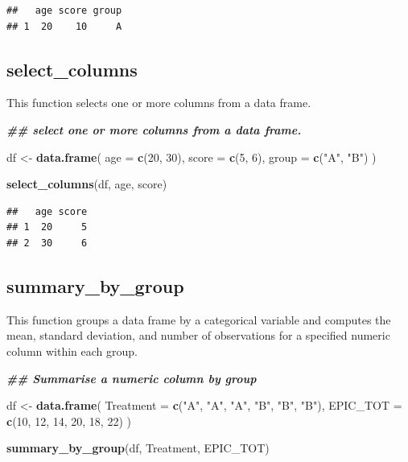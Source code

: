\documentclass[
]{book}
\newenvironment{Shaded}{\begin{snugshade}}{\end{snugshade}}
\newcommand{\AttributeTok}[1]{\textcolor[rgb]{0.13,0.29,0.53}{#1}}
\newcommand{\DecValTok}[1]{\textcolor[rgb]{0.00,0.00,0.81}{#1}}
\newcommand{\DocumentationTok}[1]{\textcolor[rgb]{0.56,0.35,0.01}{\textbf{\textit{#1}}}}
\newcommand{\FunctionTok}[1]{\textcolor[rgb]{0.13,0.29,0.53}{\textbf{#1}}}
\newcommand{\NormalTok}[1]{#1}
\newcommand{\OtherTok}[1]{\textcolor[rgb]{0.56,0.35,0.01}{#1}}
\newcommand{\StringTok}[1]{\textcolor[rgb]{0.31,0.60,0.02}{#1}}
\begin{document}
\begin{verbatim}
##   age score group
## 1  20    10     A
\end{verbatim}

\subsection{select\_columns}\label{select_columns}

This function selects one or more columns from a data frame.

\begin{Shaded}
\begin{Highlighting}[]
\DocumentationTok{\#\# select one or more columns from a data frame.}

\NormalTok{df }\OtherTok{\textless{}{-}} \FunctionTok{data.frame}\NormalTok{(}
    \AttributeTok{age =} \FunctionTok{c}\NormalTok{(}\DecValTok{20}\NormalTok{, }\DecValTok{30}\NormalTok{),}
    \AttributeTok{score =} \FunctionTok{c}\NormalTok{(}\DecValTok{5}\NormalTok{, }\DecValTok{6}\NormalTok{),}
    \AttributeTok{group =} \FunctionTok{c}\NormalTok{(}\StringTok{"A"}\NormalTok{, }\StringTok{"B"}\NormalTok{)}
\NormalTok{  )}

\FunctionTok{select\_columns}\NormalTok{(df, age, score)}
\end{Highlighting}
\end{Shaded}

\begin{verbatim}
##   age score
## 1  20     5
## 2  30     6
\end{verbatim}

\subsection{summary\_by\_group}\label{summary_by_group}

This function groups a data frame by a categorical variable and computes the mean, standard deviation, and number of observations for a specified numeric column within each group.

\begin{Shaded}
\begin{Highlighting}[]
\DocumentationTok{\#\# Summarise a numeric column by group}

\NormalTok{df }\OtherTok{\textless{}{-}} \FunctionTok{data.frame}\NormalTok{(}
    \AttributeTok{Treatment =} \FunctionTok{c}\NormalTok{(}\StringTok{"A"}\NormalTok{, }\StringTok{"A"}\NormalTok{, }\StringTok{"A"}\NormalTok{, }\StringTok{"B"}\NormalTok{, }\StringTok{"B"}\NormalTok{, }\StringTok{"B"}\NormalTok{),}
    \AttributeTok{EPIC\_TOT =} \FunctionTok{c}\NormalTok{(}\DecValTok{10}\NormalTok{, }\DecValTok{12}\NormalTok{, }\DecValTok{14}\NormalTok{, }\DecValTok{20}\NormalTok{, }\DecValTok{18}\NormalTok{, }\DecValTok{22}\NormalTok{)}
\NormalTok{  )}

\FunctionTok{summary\_by\_group}\NormalTok{(df, Treatment, EPIC\_TOT)}
\end{Highlighting}
\end{Shaded}
\end{document}
